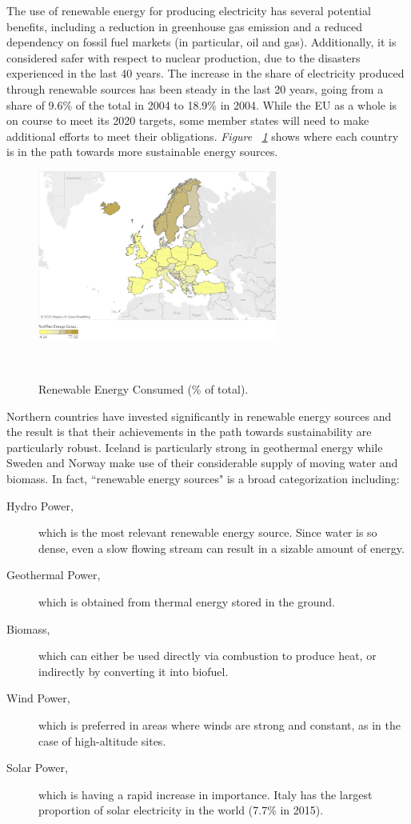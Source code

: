 \documentclass[a4paper,12pt]{book}
\begin{document}
The use of renewable energy for producing electricity has several potential benefits, including a reduction in greenhouse gas emission and a reduced dependency on fossil fuel markets (in particular, oil and gas). Additionally, it is considered safer with respect to nuclear production, due to the disasters experienced in the last 40 years. The increase in the share of electricity produced through renewable sources has been steady in the last 20 years, going from a share of 9.6\% of the total in 2004 to 18.9\% in 2004. While the EU as a whole is on course to meet its 2020 targets, some member states will need to make additional efforts to meet their obligations.
\textit{Figure ~\ref{fig:ren}} shows where each country is in the path towards more sustainable energy sources.

\begin{figure}[tb]
\begin{center}
\captionsetup{justification=centering}
\includegraphics[width=0.7\textwidth]{Images/ren.png}
\caption{Renewable Energy Consumed (\% of total). }
~\label{fig:ren}
\end{center}
\end{figure}

Northern countries have invested significantly in renewable energy sources and the result is that their achievements in the path towards sustainability are particularly robust. Iceland is particularly strong in geothermal energy while Sweden and Norway make use of their considerable supply of moving water and biomass. In fact, ``renewable energy sources" is a broad categorization including:

\begin{description}
\item[Hydro Power,] which is the most relevant renewable energy source. Since water is so dense, even a slow flowing stream can result in a sizable amount of energy.
\item [Geothermal Power,] which is obtained from thermal energy stored in the ground.
\item [Biomass,] which can either be used directly via combustion to produce heat, or indirectly by converting it into biofuel.
\item [Wind Power,] which is preferred in areas where winds are strong and constant, as in the case of high-altitude sites.
\item [Solar Power,] which is having a rapid increase in importance. Italy has the largest proportion of solar electricity in the world (7.7\% in 2015).
\end{description}
\end{document}
